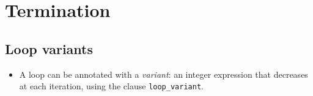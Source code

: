 \documentclass[a4paper,11pt,twoside,openright]{report}
\begin{document}





\section{Termination}

\subsection{Loop variants}

  \begin{itemize}
  \item A loop can be annotated with a \emph{variant}: an integer
    expression that decreases at each iteration, using the clause
    \verb|loop_variant|.
  \end{itemize}
\end{document}
